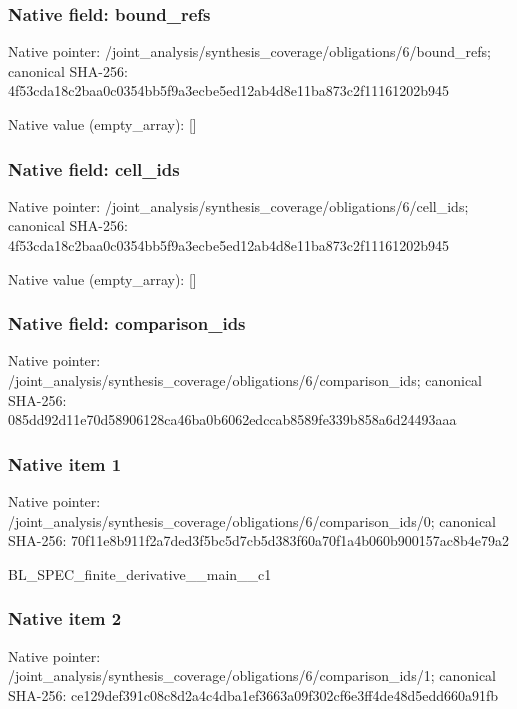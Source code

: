 \documentclass[10pt,a4paper]{article}
\begin{document}
\subsubsection{Native field: bound\_\allowbreak{}refs}
Native pointer: /joint\_\allowbreak{}analysis/synthesis\_\allowbreak{}coverage/obligations/6/bound\_\allowbreak{}refs; canonical SHA-256: 4f53cda18c2baa0c0354bb5f9a3ecbe5ed12ab4d8e11ba873c2f11161202b945

Native value (empty\_\allowbreak{}array): []

\subsubsection{Native field: cell\_\allowbreak{}ids}
Native pointer: /joint\_\allowbreak{}analysis/synthesis\_\allowbreak{}coverage/obligations/6/cell\_\allowbreak{}ids; canonical SHA-256: 4f53cda18c2baa0c0354bb5f9a3ecbe5ed12ab4d8e11ba873c2f11161202b945

Native value (empty\_\allowbreak{}array): []

\subsubsection{Native field: comparison\_\allowbreak{}ids}
Native pointer: /joint\_\allowbreak{}analysis/synthesis\_\allowbreak{}coverage/obligations/6/comparison\_\allowbreak{}ids; canonical SHA-256: 085dd92d11e70d58906128ca46ba0b6062edccab8589fe339b858a6d24493aaa

\subsubsection{Native item 1}
Native pointer: /joint\_\allowbreak{}analysis/synthesis\_\allowbreak{}coverage/obligations/6/comparison\_\allowbreak{}ids/0; canonical SHA-256: 70f11e8b911f2a7ded3f5bc5d7cb5d383f60a70f1a4b060b900157ac8b4e79a2

\begingroup\raggedright\sloppy BL\_\allowbreak{}SPEC\_\allowbreak{}finite\_\allowbreak{}derivative\_\allowbreak{}\_\allowbreak{}main\_\allowbreak{}\_\allowbreak{}c1\par\endgroup

\subsubsection{Native item 2}
Native pointer: /joint\_\allowbreak{}analysis/synthesis\_\allowbreak{}coverage/obligations/6/comparison\_\allowbreak{}ids/1; canonical SHA-256: ce129def391c08c8d2a4c4dba1ef3663a09f302cf6e3ff4de48d5edd660a91fb
\end{document}
